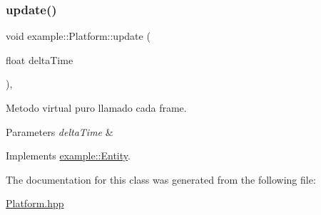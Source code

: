 \subsubsection{\texorpdfstring{update()}{update()}}
{\footnotesize\ttfamily void example\+::\+Platform\+::update (\begin{DoxyParamCaption}\item[{float}]{delta\+Time }\end{DoxyParamCaption})\hspace{0.3cm}{\ttfamily [override]}, {\ttfamily [virtual]}}



Metodo virtual puro llamado cada frame. 


\begin{DoxyParams}{Parameters}
{\em delta\+Time} & \\
\hline
\end{DoxyParams}


Implements \mbox{\hyperlink{classexample_1_1_entity_a5dded5c361451f2cfdf7ed3c7de1194f}{example\+::\+Entity}}.



The documentation for this class was generated from the following file\+:\begin{DoxyCompactItemize}
\item 
\mbox{\hyperlink{_platform_8hpp}{Platform.\+hpp}}\end{DoxyCompactItemize}
